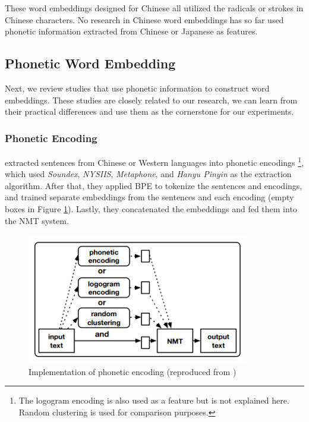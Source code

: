 These word embeddings designed for Chinese all utilized the radicals or strokes in Chinese characters. No research in Chinese word embeddings has so far used phonetic information extracted from Chinese or Japanese as features.

\subsection{Phonetic Word Embedding} \label{sec:rw_pwe}

Next, we review studies that use phonetic information to construct word embeddings. These studies are closely related to our research, we can learn from their practical differences and use them as the cornerstone for our experiments.

\subsubsection{Phonetic Encoding}

\cite{khan2019diversity} extracted sentences from Chinese or Western languages into phonetic encodings \footnote{The logogram encoding is also used as a feature but is not explained here. Random clustering is used for comparison purposes.}, which used \textit{Soundex}, \textit{NYSIIS}, \textit{Metaphone}, and \textit{Hanyu Pinyin} as the extraction algorithm. After that, they applied BPE \cite{sennrich_neural_2016} to tokenize the sentences and encodings, and trained separate embeddings from the sentences and each encoding (empty boxes in Figure \ref{fig:phonetic1}). Lastly, they concatenated the embeddings and fed them into the NMT system. 

\begin{figure}[h]
	\centering
	\includegraphics[scale=0.9]{../images/phonetic_encoding.png}
	\caption{Implementation of phonetic encoding (reproduced from \cite{khan2019diversity})}
	\label{fig:phonetic1}
\end{figure}

